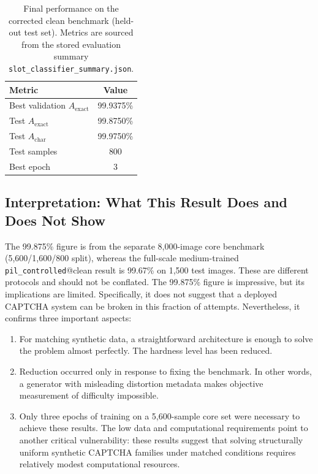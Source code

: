 \documentclass[pdflatex,sn-mathphys-num,iicol]{sn-jnl}
\begin{document}
\begin{table}[!htbp]
    \centering
    \caption{Final performance on the corrected clean benchmark (held-out test set). Metrics are sourced from the stored evaluation summary \texttt{slot\_classifier\_summary.json}.}
    \label{tab:final}
    \begin{tabular}{lc}
        \toprule
        Metric & Value \\
        \midrule
        Best validation $A_{\text{exact}}$ & 99.9375\% \\
        Test $A_{\text{exact}}$ & 99.8750\% \\
        Test $A_{\text{char}}$ & 99.9750\% \\
        Test samples & 800 \\
        Best epoch & 3 \\
        \bottomrule
    \end{tabular}
\end{table}

\subsection{Interpretation: What This Result Does and Does Not Show}

The 99.875\% figure is from the separate 8,000-image core benchmark (5,600/1,600/800 split), whereas the full-scale medium-trained \texttt{pil\_controlled}@clean result is 99.67\% on 1,500 test images. These are different protocols and should not be conflated. The 99.875\% figure is impressive, but its implications are limited. Specifically, it does not suggest that a deployed CAPTCHA system can be broken in this fraction of attempts. Nevertheless, it confirms three important aspects:

\begin{enumerate}
    \item For matching synthetic data, a straightforward architecture is enough to solve the problem almost perfectly. The hardness level has been reduced.
    \item Reduction occurred only in response to fixing the benchmark. In other words, a generator with misleading distortion metadata makes objective measurement of difficulty impossible.
    \item Only three epochs of training on a 5{,}600-sample core set were necessary to achieve these results. The low data and computational requirements point to another critical vulnerability: these results suggest that solving structurally uniform synthetic CAPTCHA families under matched conditions requires relatively modest computational resources.
\end{enumerate}
\end{document}
